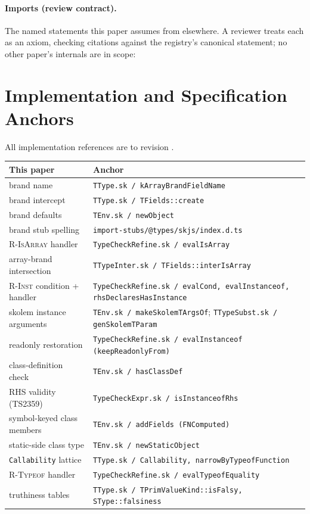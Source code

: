 \documentclass[11pt]{article}
\begin{document}


\paragraph{Imports (review contract).}
The named statements this paper assumes from elsewhere. A reviewer treats
each as an axiom, checking citations against the registry's canonical
statement; no other paper's internals are in scope:



\appendix
\section{Implementation and Specification Anchors}
\label{app:anchors}

All implementation references are to revision \texttt{\skjspinhash}.

\begin{center}
\renewcommand{\arraystretch}{1.25}
\small
\begin{tabular}{@{}l@{\quad}l@{}}
\toprule
\textbf{This paper} & \textbf{Anchor} \\
\midrule
brand name & \texttt{TType.sk / kArrayBrandFieldName} \\
brand intercept & \texttt{TType.sk / TFields::create} \\
brand defaults & \texttt{TEnv.sk / newObject} \\
brand stub spelling & \texttt{import-stubs/@types/skjs/index.d.ts} \\
\textsc{R-IsArray} handler & \texttt{TypeCheckRefine.sk / evalIsArray} \\
array-brand intersection & \texttt{TTypeInter.sk /
  TFields::interIsArray} \\
\textsc{R-Inst} condition + handler & \texttt{TypeCheckRefine.sk / evalCond,
  evalInstanceof, rhsDeclaresHasInstance} \\
skolem instance arguments & \texttt{TEnv.sk / makeSkolemTArgsOf};
  \texttt{TTypeSubst.sk / genSkolemTParam} \\
readonly restoration & \texttt{TypeCheckRefine.sk /
  evalInstanceof (keepReadonlyFrom)} \\
class-definition check & \texttt{TEnv.sk / hasClassDef} \\
RHS validity (TS2359) & \texttt{TypeCheckExpr.sk / isInstanceofRhs} \\
symbol-keyed class members & \texttt{TEnv.sk / addFields (FNComputed)} \\
static-side class type & \texttt{TEnv.sk / newStaticObject} \\
\texttt{Callability} lattice & \texttt{TType.sk / Callability,
  narrowByTypeofFunction} \\
\textsc{R-Typeof} handler & \texttt{TypeCheckRefine.sk /
  evalTypeofEquality} \\
truthiness tables & \texttt{TType.sk / TPrimValueKind::isFalsy,
  SType::falsiness} \\
\bottomrule
\end{tabular}
\end{center}
\end{document}
